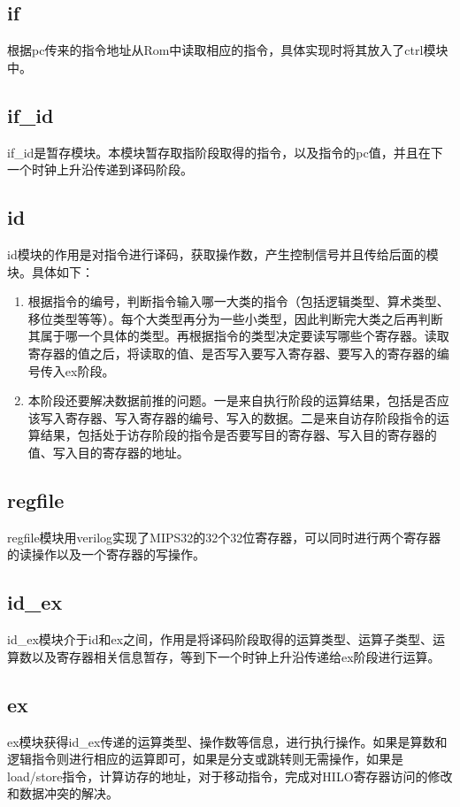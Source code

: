 \documentclass[12pt, utf8, hyperref]{ctexart}
\begin{document}
\subsection{if}
根据pc传来的指令地址从Rom中读取相应的指令，具体实现时将其放入了ctrl模块中。

\subsection{if\_id}
if\_id是暂存模块。本模块暂存取指阶段取得的指令，以及指令的pc值，并且在下一个时钟上升沿传递到译码阶段。

\subsection{id}
id模块的作用是对指令进行译码，获取操作数，产生控制信号并且传给后面的模块。具体如下：
\begin{enumerate}
    \item 根据指令的编号，判断指令输入哪一大类的指令（包括逻辑类型、算术类型、移位类型等等）。每个大类型再分为一些小类型，因此判断完大类之后再判断其属于哪一个具体的类型。再根据指令的类型决定要读写哪些个寄存器。读取寄存器的值之后，将读取的值、是否写入要写入寄存器、要写入的寄存器的编号传入ex阶段。
    \item 本阶段还要解决数据前推的问题。一是来自执行阶段的运算结果，包括是否应该写入寄存器、写入寄存器的编号、写入的数据。二是来自访存阶段指令的运算结果，包括处于访存阶段的指令是否要写目的寄存器、写入目的寄存器的值、写入目的寄存器的地址。
\end{enumerate}

\subsection{regfile}
regfile模块用verilog实现了MIPS32的32个32位寄存器，可以同时进行两个寄存器的读操作以及一个寄存器的写操作。

\subsection{id\_ex}
id\_ex模块介于id和ex之间，作用是将译码阶段取得的运算类型、运算子类型、运算数以及寄存器相关信息暂存，等到下一个时钟上升沿传递给ex阶段进行运算。

\subsection{ex}
ex模块获得id\_ex传递的运算类型、操作数等信息，进行执行操作。如果是算数和逻辑指令则进行相应的运算即可，如果是分支或跳转则无需操作，如果是load/store指令，计算访存的地址，对于移动指令，完成对HILO寄存器访问的修改和数据冲突的解决。
\end{document}
